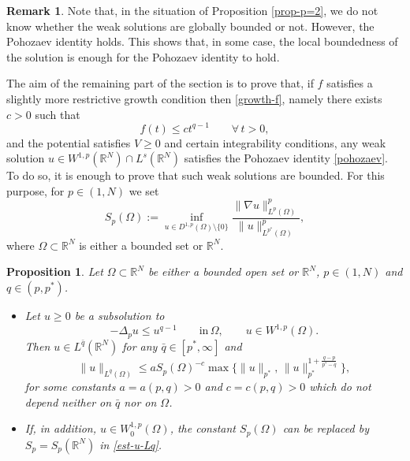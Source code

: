 \documentclass[11pt,reqno]{amsart}
\newtheorem{proposition}[theorem]{Proposition}
\theoremstyle{definition}
\newtheorem{remark}[theorem]{Remark}
\numberwithin{equation}{section}
\numberwithin{theorem}{section}
\numberwithin{equation}{section}
\numberwithin{theorem}{section}
\newcommand{\R}{\mathbb{R}}
\begin{document}
\begin{remark}
Note that, in the situation of Proposition \ref{prop-p=2}, we do not know whether the weak solutions are globally bounded or not. However, the Pohozaev identity holds. This shows that, in some case, the local boundedness of the solution is enough for the Pohozaev identity to hold.
\end{remark}
The aim of the remaining part of the section is to prove that, if $f$ satisfies a slightly more restrictive growth condition then \eqref{growth-f}, namely there exists $c>0$ such that
\begin{equation}\label{growth-f-q}
f(t)\le ct^{q-1}\qquad\forall\, t>0,    
\end{equation}
and the potential satisfies $V\ge 0$ and certain integrability conditions, any weak solution $u\in W^{1,p}(\R^N)\cap L^s(\R^N)$ satisfies the Pohozaev identity \eqref{pohozaev}. To do so, it is enough to prove that such weak solutions are bounded. For this purpose, for $p\in(1,N)$ we set
$$S_p(\Omega):=\inf_{u\in D^{1,p}(\Omega)\setminus\{0\}}\frac{\|\nabla u\|^p_{L^{p}(\Omega)}}{\|u\|^p_{L^{p^*}(\Omega)}},$$
where $\Omega\subset\R^N$ is either a bounded set or $\R^N$.
\begin{proposition}\label{prop-boundedness}
Let $\Omega\subset\R^N$ be either a bounded open set or $\R^N$, $p\in(1,N)$ and $q\in(p,p^*)$.
\begin{itemize}
\item Let $u\ge 0$ be a subsolution to
\begin{equation}\label{diff-ineq}
-\Delta_p u\le u^{q-1}\qquad\text{in}\,\Omega,\qquad u\in W^{1,p}(\Omega).
\end{equation}
Then $u\in L^{\bar{q}}(\R^N)$ for any $\bar{q}\in[p^*,\infty]$ and 
\begin{equation}\label{est-u-Lq}
\|u\|_{L^{\bar{q}}(\Omega)}\le aS_p(\Omega)^{-c}\max\{\|u\|_{p^*},\,\|u\|_{p^*}^{1+\frac{q-p}{p^*-q}}\},
\end{equation}
for some constants $a=a(p,q)>0$ and $c=c(p,q)>0$ which do not depend neither on $\bar{q}$ nor on $\Omega$.
\item If, in addition, $u\in W^{1,p}_0(\Omega)$, the constant $S_p(\Omega)$ can be replaced by $S_p=S_p(\R^N)$ in \eqref{est-u-Lq}.
\end{itemize}

\end{proposition}
\end{document}
